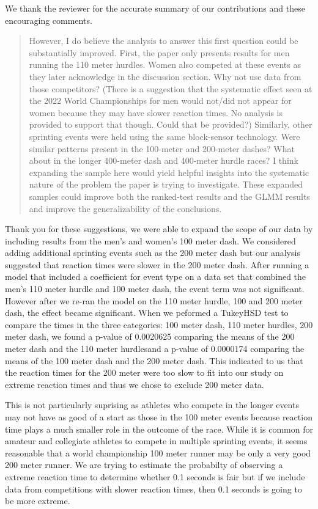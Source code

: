 \documentclass[12pt]{article}
\newenvironment{comment}%
{\begin{quotation}\noindent\small\it\color{darkblue}\ignorespaces%
}{\end{quotation}}
\begin{document}
We thank the reviewer for the accurate summary of our contributions
and these encouraging comments.  


\begin{comment}
However, I do believe the analysis to answer this first question could be
substantially improved. First, the paper only presents results for men running
the 110 meter hurdles. Women also competed at these events as they later
acknowledge in the discussion section. Why not use data from those competitors?
(There is a suggestion that the systematic effect seen at the 2022 World
Championships for men would not/did not appear for women because they may have
slower reaction times. No analysis is provided to support that though. Could
that be provided?) Similarly, other sprinting events were held using the same
block-sensor technology. Were similar patterns present in the 100-meter and
200-meter dashes? What about in the longer 400-meter dash and 400-meter hurdle
races? I think expanding the sample here would yield helpful insights into the
systematic nature of the problem the paper is trying to investigate. These
expanded samples could improve both the ranked-test results and the GLMM results
and improve the generalizability of the conclusions.
\end{comment}


Thank you for these suggestions, we were able to expand the scope of our data
by including results from the men's and women's 100 meter dash.  We considered
adding additional sprinting events such as the 200 meter dash but our analysis
suggested that reaction times were slower in the 200 meter dash.  After running
a model that included a coefficient for event type on a data set that combined
the men's 110 meter hurdle and 100 meter dash, the event term was not significant.
However after we re-ran the model on the 110 meter hurdle, 100 and 200 meter dash,
the effect became significant. When we peformed a TukeyHSD test to compare the
times in the three categories: 100 meter dash, 110 meter hurdles, 200 meter dash,
we found a p-value of 0.0020625 comparing the means of the 200 meter dash and
the 110 meter hurdlesand a p-value of 0.0000174 comparing the means of the 100
meter dash and the 200 meter dash.  This indicated to us that the reaction times
for the 200 meter were too slow to fit into our study on extreme reaction times
and thus we chose to exclude 200 meter data.


This is not particularly suprising as athletes who compete in the longer
events may not have as good of a start as those in the 100
meter events because reaction time plays a much smaller role in the outcome of
the race. While it is common for amateur and collegiate athletes to compete in
multiple sprinting events, it seems reasonable that a world championship 100
meter runner may be only a very good 200 meter runner.  We are trying to
estimate the probabilty of observing a extreme reaction time to determine
whether 0.1 seconds is fair but if we include data from competitions with slower
reaction times, then 0.1 seconds is going to be more extreme.  
\end{document}

